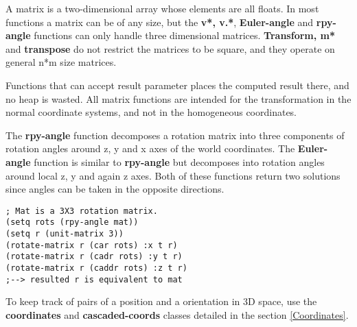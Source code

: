 A matrix is a two-dimensional array whose elements are all floats.
In most functions a matrix can be of any size,
but the {\bf v*, v.*}, {\bf Euler-angle} and {\bf rpy-angle} functions
can only handle three dimensional matrices.
{\bf Transform, m*} and {\bf transpose} do not restrict
the matrices to be square,
and they operate on general n*m size matrices.

Functions that can accept result parameter
places the computed result there, and no heap is wasted.
All matrix functions are intended for the transformation in the normal
coordinate systems, and not in the homogeneous coordinates.

The {\bf rpy-angle} function decomposes a rotation matrix into three components
of rotation angles around z, y and x axes of the world coordinates.
The {\bf Euler-angle} function is similar to {\bf rpy-angle} but
decomposes into rotation angles around local z, y and again z axes.
Both of these functions return two solutions since angles can be
taken in the opposite directions.

\begin{verbatim}
; Mat is a 3X3 rotation matrix.
(setq rots (rpy-angle mat))
(setq r (unit-matrix 3))
(rotate-matrix r (car rots) :x t r)
(rotate-matrix r (cadr rots) :y t r)
(rotate-matrix r (caddr rots) :z t r)
;--> resulted r is equivalent to mat
\end{verbatim}

To keep track of pairs of a position and a orientation in 3D space, use
the {\bf coordinates} and {\bf cascaded-coords} classes
detailed in the section \ref{Coordinates}.

